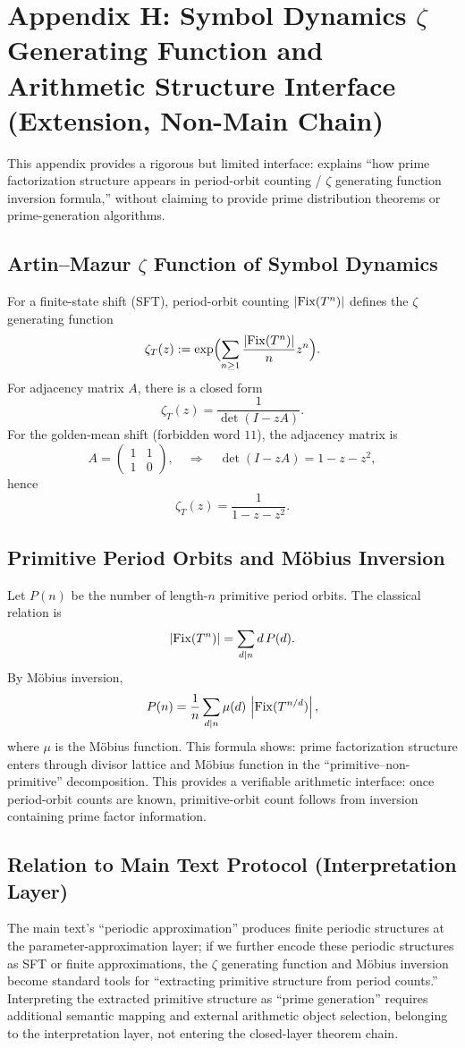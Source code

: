 \section{Appendix H: Symbol Dynamics \texorpdfstring{$\zeta$}{zeta} Generating Function and Arithmetic Structure Interface (Extension, Non-Main Chain)}
\label{app:zeta-interface}

This appendix provides a rigorous but limited interface: explains ``how prime factorization structure appears in period-orbit counting / $\zeta$ generating function inversion formula,'' without claiming to provide prime distribution theorems or prime-generation algorithms.

\subsection{Artin--Mazur \texorpdfstring{$\zeta$}{zeta} Function of Symbol Dynamics}

For a finite-state shift (SFT), period-orbit counting $\left\lvert \mathrm{Fix}(T^n)\right\rvert$ defines the $\zeta$ generating function
\[
\zeta_T(z):=\exp\Bigl(\sum_{n\ge 1}\frac{\left\lvert \mathrm{Fix}(T^n)\right\rvert}{n}z^n\Bigr).
\]
For adjacency matrix $A$, there is a closed form
\[
\zeta_T(z)=\frac{1}{\det(I-zA)}.
\]
For the golden-mean shift (forbidden word $11$), the adjacency matrix is
\[
A=\begin{pmatrix}1&1\\1&0\end{pmatrix},
\quad\Rightarrow\quad
\det(I-zA)=1-z-z^2,
\]
hence
\[
\zeta_T(z)=\frac{1}{1-z-z^2}.
\]

\subsection{Primitive Period Orbits and Möbius Inversion}

Let $P(n)$ be the number of length-$n$ primitive period orbits. The classical relation is
\[
\left\lvert \mathrm{Fix}(T^n)\right\rvert=\sum_{d\mid n} d\,P(d).
\]
By Möbius inversion,
\[
P(n)=\frac{1}{n}\sum_{d\mid n}\mu(d)\,\left\lvert \mathrm{Fix}(T^{n/d})\right\rvert,
\]
where $\mu$ is the Möbius function. This formula shows: prime factorization structure enters through divisor lattice and Möbius function in the ``primitive--non-primitive'' decomposition. This provides a verifiable arithmetic interface: once period-orbit counts are known, primitive-orbit count follows from inversion containing prime factor information.

\subsection{Relation to Main Text Protocol (Interpretation Layer)}

The main text's ``periodic approximation'' produces finite periodic structures at the parameter-approximation layer; if we further encode these periodic structures as SFT or finite approximations, the $\zeta$ generating function and Möbius inversion become standard tools for ``extracting primitive structure from period counts.'' Interpreting the extracted primitive structure as ``prime generation'' requires additional semantic mapping and external arithmetic object selection, belonging to the interpretation layer, not entering the closed-layer theorem chain.

